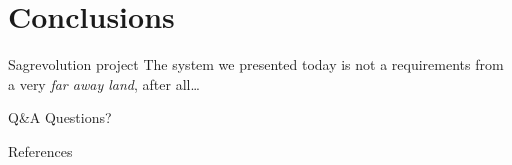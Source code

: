 

\section[Conclusions]{Conclusions}

\begin{frame}{Sagrevolution project}
	The system we presented today is not a requirements from a very
	\textit{far away land}, after all\dots
\end{frame}
\begin{frame}{Q\&A}
	Questions?
\end{frame}

\begin{frame}{References}
	\printbibliography[heading=none]
\end{frame}